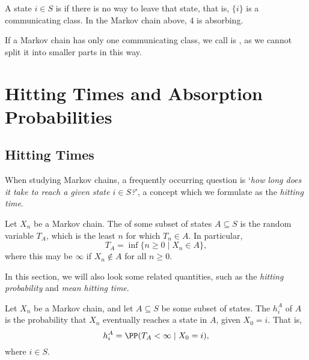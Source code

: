 \documentclass[a4paper]{scrartcl}
\begin{document}
A state $i \in S$ is  if there is no way to leave that state, that is, $\{i\}$ is a communicating class. In the Markov chain above, $4$ is absorbing.

If a Markov chain has only one communicating class, we call is , as we cannot split it into smaller parts in this way.





\section{Hitting Times and Absorption Probabilities}

\subsection{Hitting Times}

When studying Markov chains, a frequently occurring question is `\emph{how long does it take to reach a given state $i \in S$?}', a concept which we formulate as the \emph{hitting time}.

\begin{definition}
	Let $X_n$ be a Markov chain.
	The  of some subset of states $A \subseteq S$ is the random variable $T_A$, which is the least $n$ for which $T_n \in A$. 
	In particular,
	$$
	T_A = \inf\{n \geq 0 \mid X_n \in A\},
	$$
	where this may be $\infty$ if $X_n \not \in A$ for all $n \geq 0$.
\end{definition}

In this section, we will also look some related quantities, such as the \emph{hitting probability} and \emph{mean hitting time}.

\begin{definition}
	Let $X_n$ be a Markov chain, and let $A \subseteq S$ be some subset of states.
	The  $h^A_i$ of $A$ is the probability that $X_n$ eventually reaches a state in $A$, given $X_0 = i$. That is,
	$$
	h^A_i = \PP(T_A < \infty \mid X_0 = i),
	$$
	where $i \in S$.
\end{definition}
\end{document}
